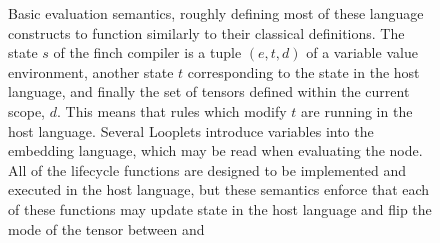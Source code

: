\begin{figure}[b]
    \caption{Basic evaluation semantics, roughly defining most of these language
    constructs to function similarly to their classical definitions.
    The state $s$ of the finch compiler is a tuple $(e, t, d)$ of a variable value
    environment, another state $t$ corresponding to the state in the
    host language, and finally the set of tensors defined within the current scope, $d$. 
    This means that rules which modify $t$ are running in the host language.
    Several Looplets introduce variables into the embedding
    language, which may be read when evaluating the {\finchvalue} node.
%
     All of the lifecycle
    functions are designed to be implemented and executed in the host language,
    but these semantics enforce that each of these functions may update state in
    the host language and flip the mode of the tensor between {\finchread} and {\finchupdate}}
    \label{fig:semantics_core}
\end{figure}


